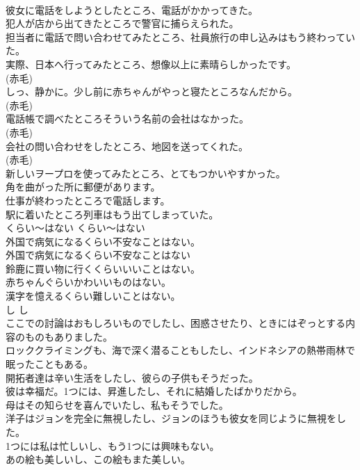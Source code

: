 \documentclass[8pt]{extreport}
\begin{document}
\begin{CJK}{UTF8}{min}
\\	彼女に電話をしようとしたところ、電話がかかってきた。  
\\	犯人が店から出てきたところで警官に捕らえられた。  
\\	担当者に電話で問い合わせてみたところ、社員旅行の申し込みはもう終わっていた。  
\\	実際、日本へ行ってみたところ、想像以上に素晴らしかったです。  
\\	(赤毛)
\\	しっ、静かに。少し前に赤ちゃんがやっと寝たところなんだから。  
\\	(赤毛)
\\	電話帳で調べたところそういう名前の会社はなかった。  
\\	(赤毛)
\\	会社の問い合わせをしたところ、地図を送ってくれた。  
\\	(赤毛)
\\	新しいヲープロを使ってみたところ、とてもつかいやすかった。  
\\	角を曲がった所に郵便があります。   
\\	仕事が終わったところで電話します。   
\\	駅に着いたところ列車はもう出てしまっていた。   
\\	くらい〜はない	くらい〜はない	
\\	外国で病気になるくらい不安なことはない。	
\\	外国で病気になるくらい不安なことはない  
\\	鈴鹿に買い物に行くくらいいいことはない。  
\\	赤ちゃんぐらいかわいいものはない。  
\\	漢字を憶えるくらい難しいことはない。  
\\	し	し	
\\	ここでの討論はおもしろいものでしたし、困惑させたり、ときにはぞっとする内容のものもありました。  
\\	ロッククライミングも、海で深く潜ることもしたし、インドネシアの熱帯雨林で眠ったこともある。  
\\	開拓者達は辛い生活をしたし、彼らの子供もそうだった。  
\\	彼は幸福だ。1つには、昇進したし、それに結婚したばかりだから。  
\\	母はその知らせを喜んでいたし、私もそうでした。  
\\	洋子はジョンを完全に無視したし、ジョンのほうも彼女を同じように無視をした。  
\\	1つには私は忙しいし、もう1つには興味もない。  
\\	あの絵も美しいし、この絵もまた美しい。  

\end{CJK}
\end{document}
